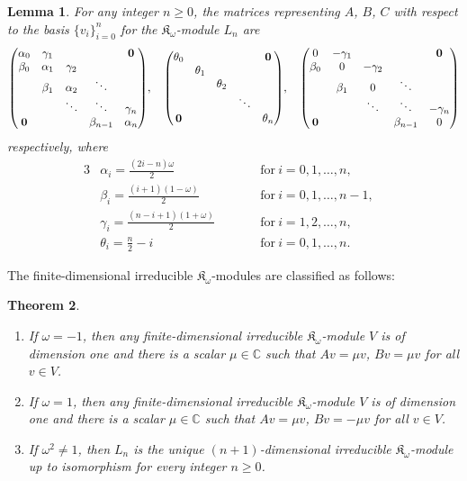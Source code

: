 \documentclass[10pt,a4paper]{amsart}
\def\C{\mathbb C}
\def\K{\mathfrak K_\omega}
\numberwithin{equation}{section}
\newtheorem{Theorem}{Theorem}[section]
\newtheorem{Lemma}[Theorem]{Lemma}
\begin{document}
\begin{Lemma}\label{lem:Vn_K}
For any integer $n\geq 0$, the matrices representing $A$, $B$, $C$ with respect to the basis $\{v_i\}_{i=0}^n$ for the $\K$-module $L_n$ are
\begin{gather*}
\begin{pmatrix}
\alpha_0 &\gamma_1 & & &{\bf 0}
\\
\beta_0 &\alpha_1 &\gamma_2
\\
&\beta_1 &\alpha_2 &\ddots
 \\
& &\ddots &\ddots &\gamma_n
 \\
{\bf 0} & & &\beta_{n-1} &\alpha_n
\end{pmatrix}\!,
\quad
\begin{pmatrix}
\theta_0 & & & &{\bf 0}
\\
 &\theta_1
\\
 & &\theta_2
 \\
 & & &\ddots
 \\
{\bf 0} & & & &\theta_n
\end{pmatrix}\!,
\quad
\begin{pmatrix}
0 &-\gamma_1 & & &{\bf 0}
\\
\beta_0 &0 &-\gamma_2
\\
&\beta_1 &0 &\ddots
 \\
& &\ddots &\ddots &-\gamma_n
 \\
{\bf 0} & & &\beta_{n-1} &0
\end{pmatrix}
\end{gather*}
respectively, where
\begin{alignat*}{3}
&\alpha_i=\frac{(2i-n)\omega}{2}\qquad
&&\text{for}\ i=0,1,\dots,n,&
\\
&\beta_i=\frac{(i+1)(1-\omega)}{2}\qquad
&&\text{for}\ i=0,1,\dots,n-1,&
\\
&\gamma_i=\frac{(n-i+1)(1+\omega)}{2}\qquad
&&\text{for}\ i=1,2,\dots,n,&
\\
&\theta_i=\frac{n}{2}-i\qquad
&&\text{for}\ i=0,1,\dots,n.&
\end{alignat*}
\end{Lemma}

The finite-dimensional irreducible $\K$-modules are classified as follows:

{\samepage\begin{Theorem}\label{thm:classification}\quad
\begin{enumerate}\itemsep=-1pt
\item[$(i)$] If $\omega=-1$, then
any finite-dimensional irreducible $\K$-module $V$ is of dimension one and there is a scalar $\mu\in \C$ such that
$Av=\mu v$, $Bv=\mu v$
 for all $v\in V$.

\item[$(ii)$] If $\omega=1$, then any finite-dimensional irreducible $\K$-module $V$ is of dimension one and there is a scalar $\mu\in \C$ such that
$Av=\mu v$, $Bv=-\mu v$ for all $v\in V$.

\item[$(iii)$] If $\omega^2\not=1$, then $L_n$ is the unique $(n+1)$-dimensional irreducible $\K$-module up to isomorphism for every integer $n\geq 0$.
\end{enumerate}
\end{Theorem}}
\end{document}
